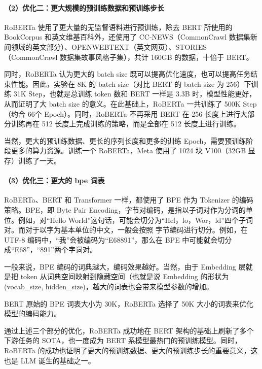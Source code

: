 \documentclass[12pt,a4paper]{book}
\begin{document}
\paragraph{（2）优化二：更大规模的预训练数据和预训练步长}\label{ux4f18ux5316ux4e8cux66f4ux5927ux89c4ux6a21ux7684ux9884ux8badux7ec3ux6570ux636eux548cux9884ux8badux7ec3ux6b65ux957f}

RoBERTa 使用了更大量的无监督语料进行预训练，除去 BERT 所使用的
BookCorpus 和英文维基百科外，还使用了 CC-NEWS（CommonCrawl
数据集新闻领域的英文部分）、OPENWEBTEXT（英文网页）、STORIES（CommonCrawl
数据集故事风格子集），共计 160GB 的数据，十倍于 BERT。

同时，RoBERTa 认为更大的 batch size
既可以提高优化速度，也可以提高任务结束性能。因此，实验在 8K 的 batch
size（对比 BERT 的 batch size 为 256）下训练 31K Step，也就是总训练
token 数和 BERT 一样是 3.3B 时，模型性能更好，从而证明了大 batch size
的意义。在此基础上，RoBERTa 一共训练了 500K Step（约合 66个
Epoch）。同时，RoBERTa 不再采用 BERT 在 256 长度上进行大部分训练再在 512
长度上完成训练的策略，而是全部在 512 长度上进行训练。

当然，更大的预训练数据、更长的序列长度和更多的训练
Epoch，需要预训练阶段更多的算力资源。训练一个 RoBERTa，Meta 使用了 1024
块 V100（32GB 显存）训练了一天。

\paragraph{（3）优化三：更大的 bpe
词表}\label{ux4f18ux5316ux4e09ux66f4ux5927ux7684-bpe-ux8bcdux8868}

RoBERTa、BERT 和 Transformer 一样，都使用了 BPE 作为 Tokenizer
的编码策略。BPE，即 Byte Pair
Encoding，字节对编码，是指以子词对作为分词的单位。例如，对``Hello
World''这句话，可能会切分为``Hel，lo，Wor，ld''四个子词对。而对于以字为基本单位的中文，一般会按照
字节编码进行切分。例如，在 UTF-8
编码中，``我''会被编码为``E68891''，那么在 BPE
中可能就会切分成``E68''，``891''两个字词对。

一般来说，BPE 编码的词典越大，编码效果越好。当然，由于 Embedding
层就是把 token 从词典空间映射到隐藏空间（也就是说 Embedding 的形状为
(vocab\_size, hidden\_size)，越大的词表也会带来模型参数的增加。

BERT 原始的 BPE 词表大小为 30K，RoBERTa 选择了 50K
大小的词表来优化模型的编码能力。

通过上述三个部分的优化，RoBERTa 成功地在 BERT
架构的基础上刷新了多个下游任务的 SOTA，也一度成为 BERT
系模型最热门的预训练模型。同时，RoBERTa
的成功也证明了更大的预训练数据、更大的预训练步长的重要意义，这也是 LLM
诞生的基础之一。
\end{document}
